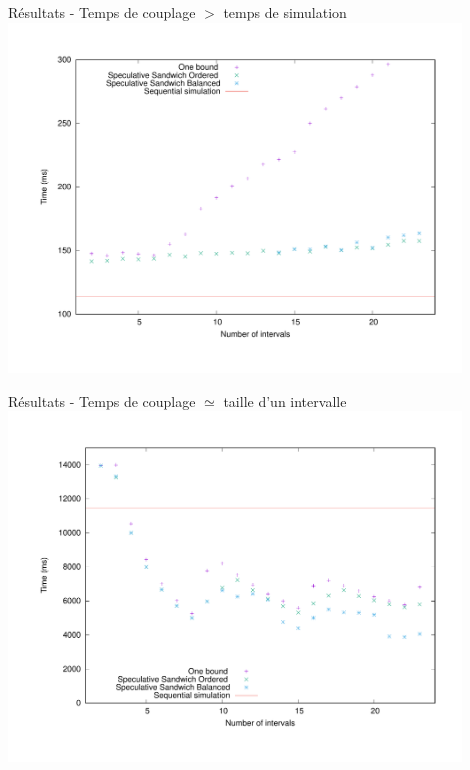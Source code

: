 \documentclass[10pt,usenames,dvipsnames]{beamer}
\begin{document}
  \begin{frame}{Résultats - Temps de couplage $>$ temps de simulation}
  \centering
    \includegraphics [width=0.9\textwidth]{time_short} 
    

  \end{frame}


  \begin{frame}{Résultats - Temps de couplage $\simeq$ taille d'un intervalle}
  \centering
    \includegraphics [width=0.9\textwidth]{time_long} 
    

  \end{frame}
  
\end{document}
